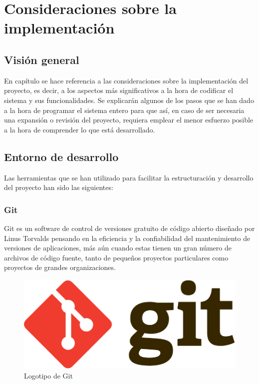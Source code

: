 \chapter{Consideraciones sobre la implementación}

\section{Visión general}

En capítulo se hace referencia a las consideraciones sobre la implementación del proyecto, es decir, a los aspectos más significativos a la hora de codificar el sistema y sus funcionalidades. Se explicarán algunos de los pasos que se han dado a la hora de programar el sistema entero para que así, en caso de ser necesaria una expansión o revisión del proyecto, requiera emplear el menor esfuerzo posible a la hora de comprender lo que está desarrollado.

\section{Entorno de desarrollo}

Las herramientas que se han utilizado para facilitar la estructuración y desarrollo del proyecto han sido las siguientes:

\subsection{Git}

Git\cite{Git} es un software de control de versiones gratuito de código abierto diseñado por Linus Torvalds pensando en la eficiencia y la confiabilidad del mantenimiento de versiones de aplicaciones, más aún cuando estas tienen un gran número de archivos de código fuente, tanto de pequeños proyectos particulares como proyectos de grandes organizaciones. 

\begin{figure}[!htp]
	 \centering
	 \includegraphics[scale=0.8]{fig/git_logo}
	 \caption{Logotipo de Git}
\end{figure}

